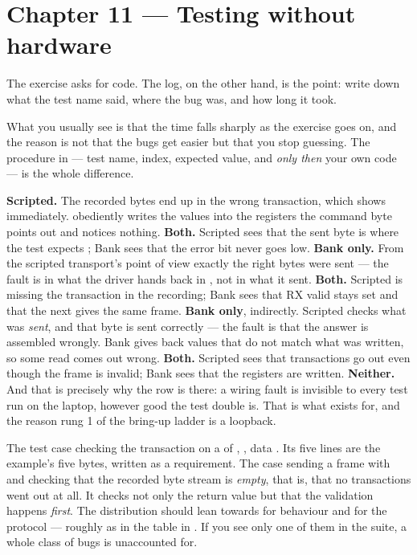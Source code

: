 \section*{Chapter 11 --- Testing without hardware}

The exercise asks for code. The log, on the other hand, is the point: write down what the test
name said, where the bug was, and how long it took.

What you usually see is that the time falls sharply as the exercise goes on, and the reason is not
that the bugs get easier but that you stop guessing. The procedure in  ---
test name, index, expected value, and \emph{only then} your own code --- is the whole difference.

 \textbf{Scripted.} The recorded bytes end up in the wrong transaction, which shows
immediately.  obediently writes the values into the registers the command byte
points out and notices nothing.
 \textbf{Both.} Scripted sees that the sent byte is  where the test expects
; Bank sees that the error bit never goes low.
 \textbf{Bank only.} From the scripted transport's point of view exactly the right bytes
were sent --- the fault is in what the driver hands back in , not in what it
sent.
 \textbf{Both.} Scripted is missing the  transaction in the recording; Bank
sees that RX valid stays set and that the next  gives the same frame.
 \textbf{Bank only}, indirectly. Scripted checks what was \emph{sent}, and that byte is
sent correctly --- the fault is that the answer is assembled wrongly. Bank gives back values that
do not match what was written, so some read comes out wrong.
 \textbf{Both.} Scripted sees that transactions go out even though the frame is invalid;
Bank sees that the registers are written.
 \textbf{Neither.} And that is precisely why the row is there: a wiring fault is invisible
to every test run on the laptop, however good the test double is. That is what 
exists for, and the reason rung 1 of the bring-up ladder is a loopback.

 The test case checking the  transaction on a  of
, , data . Its five  lines are the
example's five bytes, written as a requirement.
 The case sending a frame with  and checking that the recorded byte stream is
\emph{empty}, that is, that no transactions went out at all. It checks not only the return value
but that the validation happens \emph{first}.
 The distribution should lean towards  for behaviour and
 for the protocol --- roughly as in the table in .
If you see only one of them in the suite, a whole class of bugs is unaccounted for.


